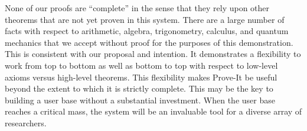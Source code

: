 \documentclass{article}[12pt]
\begin{document}
None of our proofs are ``complete'' in the sense that they rely upon other theorems that are not yet proven in this system.  There are a large number of facts with respect to arithmetic, algebra, trigonometry, calculus, and quantum mechanics that we accept without proof for the purposes of this demonstration.  This is consistent with our proposal and intention.  It demonstrates a flexibility to work from top to bottom as well as bottom to top with respect to low-level axioms versus high-level theorems.  This flexibility makes Prove-It be useful beyond the extent to which it is strictly complete.  This may be the key to building a user base without a substantial investment.  When the user base reaches a critical mass, the system will be an invaluable tool for a diverse array of researchers.
\end{document}
